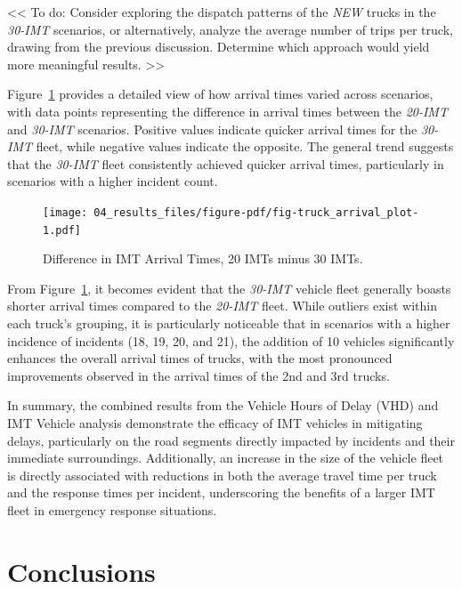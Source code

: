 \documentclass[fancy, oneside, mastersfancy, ms]{byuthesis}
\begin{document}
\textless\textless{} To do: Consider exploring the dispatch patterns of
the \emph{NEW} trucks in the \emph{30-IMT} scenarios, or alternatively,
analyze the average number of trips per truck, drawing from the previous
discussion. Determine which approach would yield more meaningful
results. \textgreater\textgreater{}

Figure~\ref{fig-truck_arrival_plot} provides a detailed view of how
arrival times varied across scenarios, with data points representing the
difference in arrival times between the \emph{20-IMT} and \emph{30-IMT}
scenarios. Positive values indicate quicker arrival times for the
\emph{30-IMT} fleet, while negative values indicate the opposite. The
general trend suggests that the \emph{30-IMT} fleet consistently
achieved quicker arrival times, particularly in scenarios with a higher
incident count.

\begin{figure}

{\centering \texttt{[image: 04\_results\_files/figure-pdf/fig-truck\_arrival\_plot-1.pdf]}

}

\caption{\label{fig-truck_arrival_plot}Difference in IMT Arrival Times,
20 IMTs minus 30 IMTs.}

\end{figure}

From Figure~\ref{fig-truck_arrival_plot}, it becomes evident that the
\emph{30-IMT} vehicle fleet generally boasts shorter arrival times
compared to the \emph{20-IMT} fleet. While outliers exist within each
truck's grouping, it is particularly noticeable that in scenarios with a
higher incidence of incidents (18, 19, 20, and 21), the addition of 10
vehicles significantly enhances the overall arrival times of trucks,
with the most pronounced improvements observed in the arrival times of
the 2nd and 3rd trucks.

In summary, the combined results from the Vehicle Hours of Delay (VHD)
and IMT Vehicle analysis demonstrate the efficacy of IMT vehicles in
mitigating delays, particularly on the road segments directly impacted
by incidents and their immediate surroundings. Additionally, an increase
in the size of the vehicle fleet is directly associated with reductions
in both the average travel time per truck and the response times per
incident, underscoring the benefits of a larger IMT fleet in emergency
response situations.


\hypertarget{sec-conclusions}{%
\chapter{Conclusions}\label{sec-conclusions}}
\end{document}
